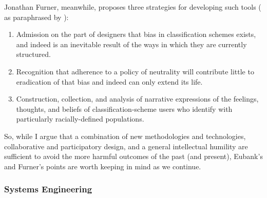 Jonathan Furner, meanwhile, proposes three strategies for developing such tools (\cite{furner2007dewey} as paraphrased by \cite{nobleAlgorithmsOppressionHow2018}):

\begin{enumerate} \setlength{\itemsep}{0pt} \setlength{\parskip}{0pt} 
	\item{Admission on the part of designers that bias in classification schemes exists, and indeed is an inevitable result of the ways in which they are currently structured.}
	\item{Recognition that adherence to a policy of neutrality will contribute little to eradication of that bias and indeed can only extend its life.}
	\item{Construction, collection, and analysis of narrative expressions of the feelings, thoughts, and beliefs of classification-scheme users who identify with particularly racially-defined populations.}
\end{enumerate}

So, while I argue that a combination of new methodologies and technologies, collaborative and participatory design, and a general intellectual humility are sufficient to avoid the more harmful outcomes of the past (and present), Eubank's and Furner's points are worth keeping in mind as we continue.




%

\subsubsection{Systems Engineering} \label{sec:se_critique}

